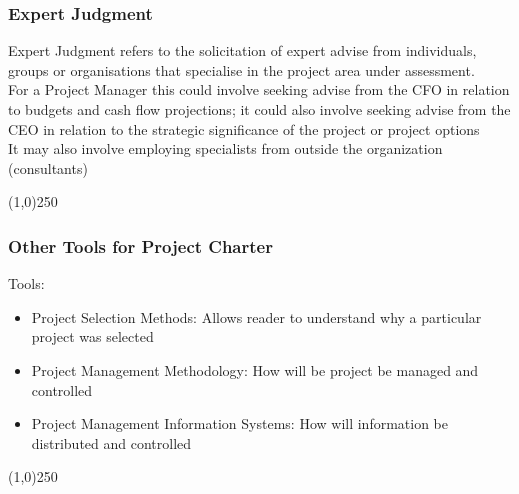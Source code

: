 \begin{frame}
\frametitle{Expert Judgment}
Expert Judgment refers to the solicitation of expert advise from individuals, groups or organisations that specialise in the project area under assessment.\\
For a Project Manager this could involve seeking advise from the CFO in relation to budgets and cash flow projections; it could also involve seeking advise from the CEO in relation to the strategic significance of the project or project options\\
It may also involve employing specialists from outside the organization (consultants)\\
\end{frame}\begin{center}\line(1,0){250}\end{center}
%
%

\begin{frame}
\frametitle{Other Tools for Project Charter} 
Tools:
\begin{itemize}
	\item Project Selection Methods: Allows reader to understand why a particular project was selected
	\item Project Management Methodology: How will be project be managed and controlled
	\item Project Management Information Systems: How will information be distributed and controlled
\end{itemize}
\end{frame}\begin{center}\line(1,0){250}\end{center}
%
%

